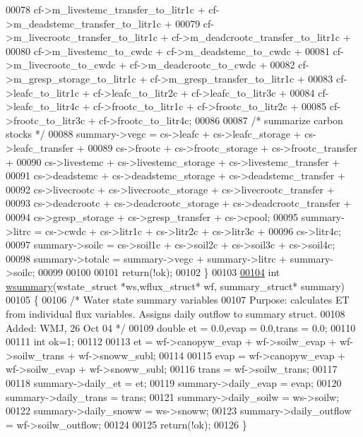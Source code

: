 \begin{DoxyCode}
00078         cf->m\_livestemc\_transfer\_to\_litr1c + cf->m\_deadstemc\_transfer\_to\_litr1c +
00079         cf->m\_livecrootc\_transfer\_to\_litr1c + cf->m\_deadcrootc\_transfer\_to\_litr1c +
00080         cf->m\_livestemc\_to\_cwdc + cf->m\_deadstemc\_to\_cwdc + 
00081         cf->m\_livecrootc\_to\_cwdc + cf->m\_deadcrootc\_to\_cwdc +
00082         cf->m\_gresp\_storage\_to\_litr1c + cf->m\_gresp\_transfer\_to\_litr1c +
00083         cf->leafc\_to\_litr1c + cf->leafc\_to\_litr2c + cf->leafc\_to\_litr3c + 
00084         cf->leafc\_to\_litr4c + cf->frootc\_to\_litr1c + cf->frootc\_to\_litr2c +
00085         cf->frootc\_to\_litr3c + cf->frootc\_to\_litr4c;
00086         
00087     \textcolor{comment}{/* summarize carbon stocks */}
00088     summary->vegc = cs->leafc + cs->leafc\_storage + cs->leafc\_transfer + 
00089         cs->frootc + cs->frootc\_storage + cs->frootc\_transfer +
00090         cs->livestemc + cs->livestemc\_storage + cs->livestemc\_transfer +
00091         cs->deadstemc + cs->deadstemc\_storage + cs->deadstemc\_transfer +
00092         cs->livecrootc + cs->livecrootc\_storage + cs->livecrootc\_transfer +
00093         cs->deadcrootc + cs->deadcrootc\_storage + cs->deadcrootc\_transfer +
00094         cs->gresp\_storage + cs->gresp\_transfer + cs->cpool;
00095     summary->litrc = cs->cwdc + cs->litr1c + cs->litr2c + cs->litr3c + 
00096         cs->litr4c;
00097     summary->soilc = cs->soil1c + cs->soil2c + cs->soil3c + cs->soil4c;
00098     summary->totalc = summary->vegc + summary->litrc + summary->soilc;
00099     
00100     
00101     \textcolor{keywordflow}{return}(!ok);
00102 \}
00103 
\hypertarget{summary_8c_source_l00104}{}\hyperlink{summary_8c_a6f21695898e69d2e04041da9158e38fa}{00104} \textcolor{keywordtype}{int} \hyperlink{summary_8c_a6f21695898e69d2e04041da9158e38fa}{wsummary}(wstate\_struct *ws,wflux\_struct* wf, summary\_struct* summary)
00105 \{
00106     \textcolor{comment}{/* Water state summary variables}
00107 \textcolor{comment}{        Purpose: calculates ET from individual flux variables.  Assigns daily outflow to summary struct.}
00108 \textcolor{comment}{        Added: WMJ, 26 Oct 04         */}
00109         \textcolor{keywordtype}{double} et = 0.0,evap = 0.0,trans = 0.0;
00110 
00111         \textcolor{keywordtype}{int} ok=1;
00112 
00113         et = wf->canopyw\_evap + wf->soilw\_evap + wf->soilw\_trans + wf->snoww\_subl;
00114 
00115         evap = wf->canopyw\_evap + wf->soilw\_evap + wf->snoww\_subl;
00116         trans = wf->soilw\_trans;
00117 
00118         summary->daily\_et = et;
00119         summary->daily\_evap = evap;
00120         summary->daily\_trans = trans;
00121         summary->daily\_soilw = ws->soilw;
00122         summary->daily\_snoww = ws->snoww;
00123         summary->daily\_outflow = wf->soilw\_outflow;
00124 
00125         \textcolor{keywordflow}{return}(!ok);
00126 \}
\end{DoxyCode}
